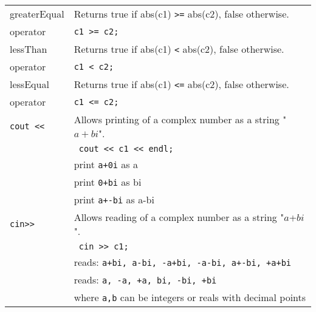\documentclass[11pt]{article}
\begin{document}
\begin{tabular}{|p{1in}|p{4in}|}
greaterEqual & Returns true if abs(c1) \texttt{>=} abs(c2), false otherwise. \\
operator & \texttt{c1 >= c2;} \\
\hline
lessThan & Returns true if abs(c1) \texttt{<} abs(c2), false otherwise. \\
operator & \texttt{c1 < c2;} \\
\hline
lessEqual & Returns true if abs(c1) \texttt{<=} abs(c2), false otherwise. \\
operator & \texttt{c1 <= c2;} \\
\hline
\texttt{cout <<} & Allows printing of a complex number as a string "$a+bi$". \\
& \texttt{ cout << c1 << endl;} \\
& print \texttt{a+0i} as a \\
& print \texttt{0+bi} as bi \\
& print \texttt{a+-bi} as a-bi \\
\hline
\texttt{cin>>} & Allows reading of a complex number as a string "$a$+$bi$". \\
& \texttt{ cin >> c1;} \\
& reads: \texttt{a+bi, a-bi, -a+bi, -a-bi, a+-bi, +a+bi} \\
& reads: \texttt{a, -a, +a, bi, -bi, +bi} \\
& where \texttt{a,b} can be integers or reals with decimal points \\
\hline
\end{tabular}
\end{document}
